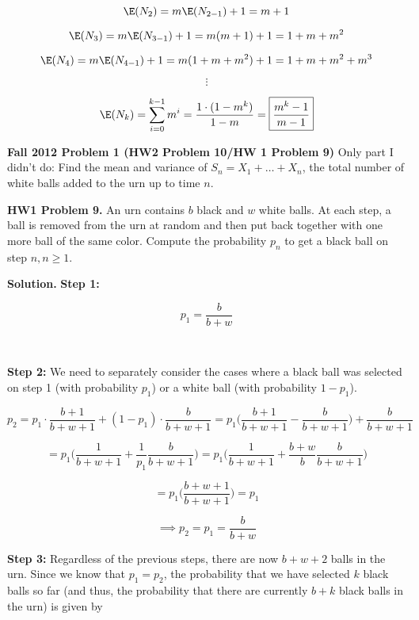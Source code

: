 \begin{enumerate}[(a)]
\[
\E(N_2) = m \E(N_{2-1}) + 1 = m + 1
\]

\[
\E(N_3) = m \E(N_{3-1}) + 1 = m(m + 1) + 1 = 1 + m + m^2
\]

\[
\E(N_4) = m \E(N_{4-1}) + 1 = m(1 + m + m^2) + 1 = 1 + m + m^2 + m^3
\]

\[
\vdots
\]

\[
\E(N_k) = \sum_{i=0}^{k-1} m^i = \frac{1 \cdot (1-m^{k})}{1 - m} = \boxed{\frac{m^k -1}{m-1}}
\]


\end{enumerate}


\textbf{Fall 2012 Problem 1 (HW2 Problem 10/HW 1 Problem 9)} Only part I didn't do: Find the mean and variance of \(S_n = X_1 + \ldots + X_n\), the total number of white balls added to the urn up to time \(n\).

\textbf{HW1 Problem 9.} An urn contains \(b\) black and \(w\) white balls. At each step, a ball is removed from the urn at random and then put back together with one more ball of the same color. Compute the probability \(p_n\) to get a black ball on step \(n, n \geq 1\).

\textbf{Solution.} \textbf{Step 1:}

\[
p_1 = \frac{b}{b+w}
\]

\

\textbf{Step 2:} We need to separately consider the cases where a black ball was selected on step 1 (with probability \(p_1\)) or a white ball (with probability \(1 - p_1\)).

\[
p_2 = p_1 \cdot \frac{b + 1}{b + w + 1} + (1 - p_1) \cdot \frac{b}{b + w + 1} = p_1 \bigg(\frac{b + 1}{b + w + 1} -  \frac{b}{b + w + 1} \bigg) + \frac{b}{b + w + 1}
\]

\[
= p_1\bigg( \frac{1}{b + w + 1} + \frac{1}{p_1}\frac{b}{b + w + 1} \bigg) = p_1\bigg( \frac{1}{b + w + 1} + \frac{b + w}{b}\frac{b}{b + w + 1} \bigg) 
\]

\[
= p_1 \bigg(\frac{b + w + 1}{b + w + 1} \bigg) = p_1
\]



\[
\implies p_2 = p_1 =  \frac{b}{b+w}
\]

\textbf{Step 3:} Regardless of the previous steps, there are now \(b + w + 2\) balls in the urn. Since we know that \(p_1 = p_2\), the probability that we have selected \(k\) black balls so far (and thus, the probability that there are currently \(b + k\) black balls in the urn) is given by

